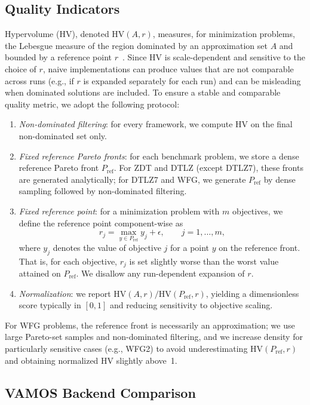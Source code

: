 \documentclass[journal]{IEEEtran}
\newcommand{\VAMOS}{VAMOS}
\newcommand{\HV}{\mathrm{HV}}
\begin{document}
\subsection{Quality Indicators}
\label{sec:hv}

Hypervolume (HV), denoted $\HV(A,r)$, measures, for minimization problems, the Lebesgue measure of the region dominated by an approximation set $A$ and bounded by a reference point $r$~\cite{ZTL+03}. Since HV is scale-dependent and sensitive to the choice of $r$, naive implementations can produce values that are not comparable across runs (e.g., if $r$ is expanded separately for each run) and can be misleading when dominated solutions are included. To ensure a stable and comparable quality metric, we adopt the following protocol:
\begin{enumerate}[leftmargin=*]
  \item \textit{Non-dominated filtering}: for every framework, we compute HV on the final non-dominated set only.
  \item \textit{Fixed reference Pareto fronts}: for each benchmark problem, we store a dense reference Pareto front $P_{\text{ref}}$. For ZDT and DTLZ (except DTLZ7), these fronts are generated analytically; for DTLZ7 and WFG, we generate $P_{\text{ref}}$ by dense sampling followed by non-dominated filtering.
  \item \textit{Fixed reference point}: for a minimization problem with $m$ objectives, we define the reference point component-wise as
  \[
  r_j = \max_{y \in P_{\text{ref}}} y_j + \epsilon, \qquad j = 1, \dots, m,
  \]
  where $y_j$ denotes the value of objective $j$ for a point $y$ on the reference front. That is, for each objective, $r_j$ is set slightly worse than the worst value attained on $P_{\text{ref}}$. We disallow any run-dependent expansion of $r$.
  \item \textit{Normalization}: we report $\HV(A,r) / \HV(P_{\text{ref}},r)$, yielding a dimensionless score typically in $[0,1]$ and reducing sensitivity to objective scaling.
\end{enumerate}


For WFG problems, the reference front is necessarily an approximation; we use large Pareto-set samples and non-dominated filtering, and we increase density for particularly sensitive cases (e.g., WFG2) to avoid underestimating $\HV(P_{\text{ref}}, r)$ and obtaining normalized HV slightly above~1.

\subsection{\VAMOS{} Backend Comparison}
\end{document}
